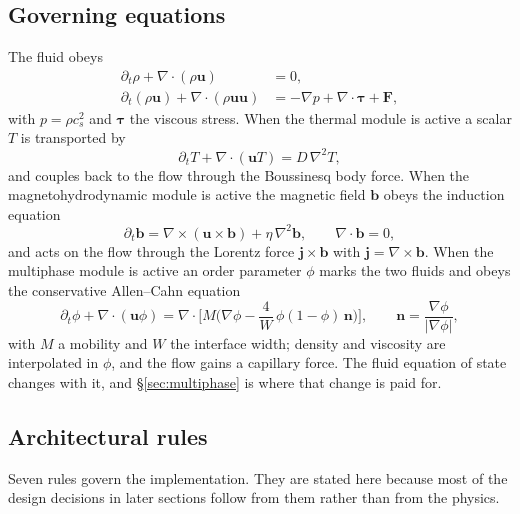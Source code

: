 \documentclass[11pt,a4paper]{article}
\newcommand{\cs}{c_s}
\newcommand{\uu}{\bm{u}}
\newcommand{\bb}{\bm{b}}
\newcommand{\nn}{\bm{n}}
\begin{document}
\subsection{Governing equations}

The fluid obeys
\begin{align}
  \partial_t \rho + \nabla\!\cdot(\rho\uu) &= 0, \\
  \partial_t(\rho\uu) + \nabla\!\cdot(\rho\uu\uu)
     &= -\nabla p + \nabla\!\cdot\bm{\tau} + \bm{F},
\end{align}
with $p=\rho\cs^2$ and $\bm{\tau}$ the viscous stress. When the thermal module is
active a scalar $T$ is transported by
\begin{equation}
  \partial_t T + \nabla\!\cdot(\uu T) = D\,\nabla^2 T ,
\end{equation}
and couples back to the flow through the Boussinesq body force. When the
magnetohydrodynamic module is active the magnetic field $\bb$ obeys the induction
equation
\begin{equation}
  \partial_t \bb = \nabla\times(\uu\times\bb) + \eta\,\nabla^2\bb,
  \qquad \nabla\!\cdot\bb = 0,
  \label{eq:induction}
\end{equation}
and acts on the flow through the Lorentz force $\bm{j}\times\bb$ with
$\bm{j}=\nabla\times\bb$. When the multiphase module is active an order
parameter $\phi$ marks the two fluids and obeys the conservative Allen--Cahn
equation
\begin{equation}
  \partial_t \phi + \nabla\!\cdot(\uu\phi)
    = \nabla\!\cdot\!\Big[ M\Big(\nabla\phi
      - \frac{4}{W}\,\phi(1-\phi)\,\nn\Big)\Big],
  \qquad \nn = \frac{\nabla\phi}{|\nabla\phi|},
  \label{eq:ace}
\end{equation}
with $M$ a mobility and $W$ the interface width; density and viscosity are
interpolated in $\phi$, and the flow gains a capillary force. The fluid equation
of state changes with it, and \S\ref{sec:multiphase} is where that change is
paid for.

\subsection{Architectural rules}
\label{sec:rules}

Seven rules govern the implementation. They are stated here because most of the
design decisions in later sections follow from them rather than from the physics.
\end{document}
